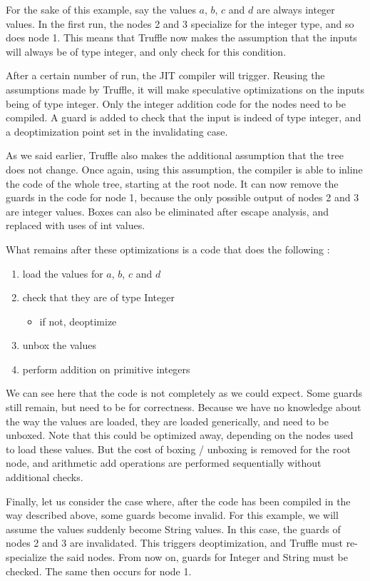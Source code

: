 \documentclass[twoside,11pt,a4paper]{article}
\newcommand{\java}[1]{\textsf{#1}}
\begin{document}
For the sake of this example, say the values $a$, $b$, $c$ and $d$ are always integer values. In the first run, the nodes 2 and 3 specialize for the integer type, and so does node 1. This means that Truffle now makes the assumption that the inputs will always be of type integer, and only check for this condition.

After a certain number of run, the JIT compiler will trigger. Reusing the assumptions made by Truffle, it will make speculative optimizations on the inputs being of type integer. Only the integer addition code for the nodes need to be compiled. A guard is added to check that the input is indeed of type integer, and a deoptimization point set in the invalidating case.

As we said earlier, Truffle also makes the additional assumption that the tree does not change. Once again, using this assumption, the compiler is able to inline the code of the whole tree, starting at the root node. It can now remove the guards in the code for node 1, because the only possible output of nodes 2 and 3 are integer values. Boxes can also be eliminated after escape analysis, and replaced with uses of \java{int} values.

What remains after these optimizations is a code that does the following :
\begin{enumerate}
\item load the values for $a$, $b$, $c$ and $d$
\item check that they are of type \java{Integer}
	\begin{itemize}
	\item if not, deoptimize
	\end{itemize}
\item unbox the values
\item perform addition on primitive integers
\end{enumerate}

We can see here that the code is not completely as we could expect. Some guards still remain, but need to be for correctness. Because we have no knowledge about the way the values are loaded, they are loaded generically, and need to be unboxed. Note that this could be optimized away, depending on the nodes used to load these values. But the cost of boxing / unboxing is removed for the root node, and arithmetic add operations are performed sequentially without additional checks.

Finally, let us consider the case where, after the code has been compiled in the way described above, some guards become invalid. For this example, we will assume the values suddenly become \java{String} values. In this case, the guards of nodes 2 and 3 are invalidated. This triggers deoptimization, and Truffle must re-specialize the said nodes. From now on, guards for \java{Integer} and \java{String} must be checked. The same then occurs for node 1.
\end{document}
